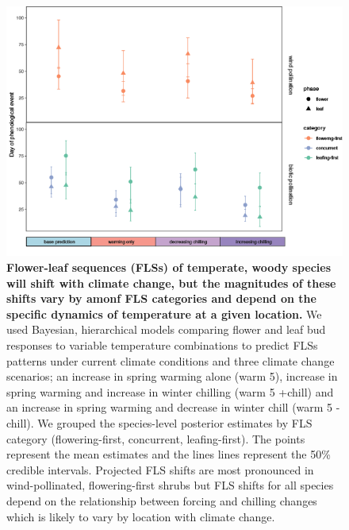 \documentclass[11pt]{article}
\begin{document}
\pagebreak
\begin{figure}[h!]
    \centering
 \includegraphics[width=.8\textwidth]{..//Plots/Flobuds_manuscript_figs/postergroups2.png}
    \caption{\textbf{Flower-leaf sequences (FLSs) of temperate, woody species will shift with climate change, but the magnitudes of these shifts vary by amonf FLS categories and depend on the specific dynamics of temperature at a given location.} We used Bayesian, hierarchical models comparing flower and leaf bud responses to variable temperature combinations to predict FLSs patterns under current climate conditions and three climate change scenarios;  an increase in spring warming alone (warm 5), increase in spring warming and increase in winter chilling (warm 5 +chill) and an increase in spring warming and decrease in winter chill (warm 5 -chill). We grouped the species-level posterior estimates by FLS category (flowering-first, concurrent, leafing-first). The points represent the mean estimates and the lines lines represent the 50\% credible intervals. Projected FLS shifts are most pronounced in wind-pollinated, flowering-first shrubs but FLS shifts for all species depend on the relationship between forcing and chilling changes which is likely to vary by location with climate change.}
    \label{fig:preddy}
\end{figure}
\end{document}

